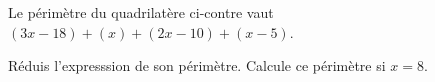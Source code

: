 %
%
Le périmètre du quadrilatère ci-contre vaut $\left(3x-18\right) + (x) +\left(2x-10\right) + \left(x-5\right)$.
  \begin{tasks}
    \task Réduis l'expresssion de son périmètre.
    \task Calcule ce périmètre si $x=8$.
  \end{tasks}
